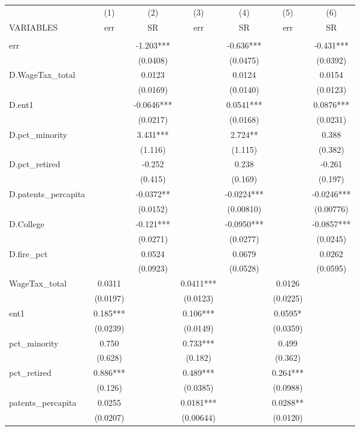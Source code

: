 \begin{tabular}{lcccccc} \hline
 & (1) & (2) & (3) & (4) & (5) & (6) \\
VARIABLES & err & SR & err & SR & err & SR \\ \hline
 &  &  &  &  &  &  \\
err &  & -1.203*** &  & -0.636*** &  & -0.431*** \\
 &  & (0.0408) &  & (0.0475) &  & (0.0392) \\
D.WageTax\_total &  & 0.0123 &  & 0.0124 &  & 0.0154 \\
 &  & (0.0169) &  & (0.0140) &  & (0.0123) \\
D.ent1 &  & -0.0646*** &  & 0.0541*** &  & 0.0876*** \\
 &  & (0.0217) &  & (0.0168) &  & (0.0231) \\
D.pct\_minority &  & 3.431*** &  & 2.724** &  & 0.388 \\
 &  & (1.116) &  & (1.115) &  & (0.382) \\
D.pct\_retired &  & -0.252 &  & 0.238 &  & -0.261 \\
 &  & (0.415) &  & (0.169) &  & (0.197) \\
D.patents\_percapita &  & -0.0372** &  & -0.0224*** &  & -0.0246*** \\
 &  & (0.0152) &  & (0.00810) &  & (0.00776) \\
D.College &  & -0.121*** &  & -0.0950*** &  & -0.0857*** \\
 &  & (0.0271) &  & (0.0277) &  & (0.0245) \\
D.fire\_pct &  & 0.0524 &  & 0.0679 &  & 0.0262 \\
 &  & (0.0923) &  & (0.0528) &  & (0.0595) \\
WageTax\_total & 0.0311 &  & 0.0411*** &  & 0.0126 &  \\
 & (0.0197) &  & (0.0123) &  & (0.0225) &  \\
ent1 & 0.185*** &  & 0.106*** &  & 0.0595* &  \\
 & (0.0239) &  & (0.0149) &  & (0.0359) &  \\
pct\_minority & 0.750 &  & 0.733*** &  & 0.499 &  \\
 & (0.628) &  & (0.182) &  & (0.362) &  \\
pct\_retired & 0.886*** &  & 0.489*** &  & 0.264*** &  \\
 & (0.126) &  & (0.0385) &  & (0.0988) &  \\
patents\_percapita & 0.0255 &  & 0.0181*** &  & 0.0288** &  \\
 & (0.0207) &  & (0.00644) &  & (0.0120) &  \\

\end{tabular}

